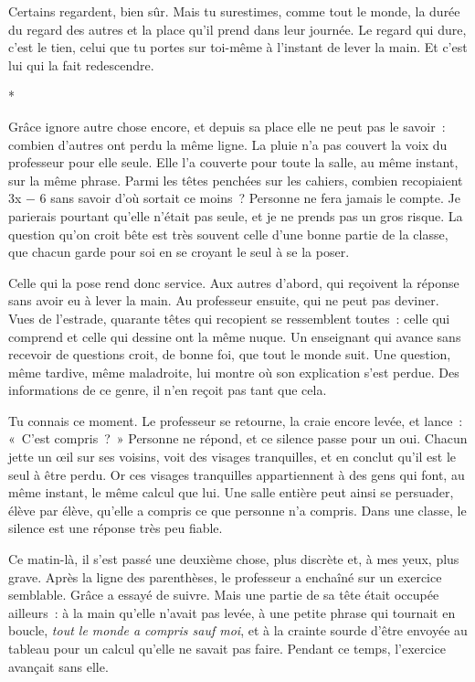\documentclass[10.5pt,twoside,openright]{book}
\newcommand{\asterisme}{\par\vspace{0.7em}\centerline{\color{gris}*\quad*\quad*}\vspace{0.7em}\par\noindent}
\begin{document}
Certains regardent, bien sûr. Mais tu surestimes, comme tout le monde, la durée du regard des autres et la place qu’il prend dans leur journée. Le regard qui dure, c’est le tien, celui que tu portes sur toi-même à l’instant de lever la main. Et c’est lui qui la fait redescendre.

\asterisme

Grâce ignore autre chose encore, et depuis sa place elle ne peut pas le savoir : combien d’autres ont perdu la même ligne. La pluie n’a pas couvert la voix du professeur pour elle seule. Elle l’a couverte pour toute la salle, au même instant, sur la même phrase. Parmi les têtes penchées sur les cahiers, combien recopiaient 3x − 6 sans savoir d’où sortait ce moins ? Personne ne fera jamais le compte. Je parierais pourtant qu’elle n’était pas seule, et je ne prends pas un gros risque. La question qu’on croit bête est très souvent celle d’une bonne partie de la classe, que chacun garde pour soi en se croyant le seul à se la poser.

Celle qui la pose rend donc service. Aux autres d’abord, qui reçoivent la réponse sans avoir eu à lever la main. Au professeur ensuite, qui ne peut pas deviner. Vues de l’estrade, quarante têtes qui recopient se ressemblent toutes : celle qui comprend et celle qui dessine ont la même nuque. Un enseignant qui avance sans recevoir de questions croit, de bonne foi, que tout le monde suit. Une question, même tardive, même maladroite, lui montre où son explication s’est perdue. Des informations de ce genre, il n’en reçoit pas tant que cela.

Tu connais ce moment. Le professeur se retourne, la craie encore levée, et lance : « C’est compris ? » Personne ne répond, et ce silence passe pour un oui. Chacun jette un œil sur ses voisins, voit des visages tranquilles, et en conclut qu’il est le seul à être perdu. Or ces visages tranquilles appartiennent à des gens qui font, au même instant, le même calcul que lui. Une salle entière peut ainsi se persuader, élève par élève, qu’elle a compris ce que personne n’a compris. Dans une classe, le silence est une réponse très peu fiable.

Ce matin-là, il s’est passé une deuxième chose, plus discrète et, à mes yeux, plus grave. Après la ligne des parenthèses, le professeur a enchaîné sur un exercice semblable. Grâce a essayé de suivre. Mais une partie de sa tête était occupée ailleurs : à la main qu’elle n’avait pas levée, à une petite phrase qui tournait en boucle, \emph{tout le monde a compris sauf moi}, et à la crainte sourde d’être envoyée au tableau pour un calcul qu’elle ne savait pas faire. Pendant ce temps, l’exercice avançait sans elle.
\end{document}

